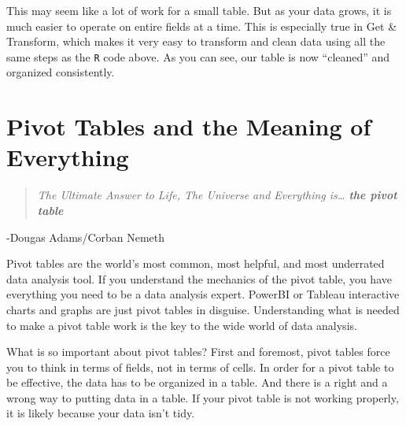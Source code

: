 \documentclass[]{book}
\newenvironment{Shaded}{\begin{snugshade}}{\end{snugshade}}
\newcommand{\CommentTok}[1]{\textcolor[rgb]{0.56,0.35,0.01}{\textit{#1}}}
\newcommand{\DataTypeTok}[1]{\textcolor[rgb]{0.13,0.29,0.53}{#1}}
\newcommand{\KeywordTok}[1]{\textcolor[rgb]{0.13,0.29,0.53}{\textbf{#1}}}
\newcommand{\NormalTok}[1]{#1}
\newcommand{\OperatorTok}[1]{\textcolor[rgb]{0.81,0.36,0.00}{\textbf{#1}}}
\newcommand{\OtherTok}[1]{\textcolor[rgb]{0.56,0.35,0.01}{#1}}
\newcommand{\StringTok}[1]{\textcolor[rgb]{0.31,0.60,0.02}{#1}}
\begin{document}
\begin{Shaded}
\begin{Highlighting}[]
{{{{{\CommentTok{#print to datatable}
\NormalTok{sites_cleaned}\OperatorTok{%
    \DataTypeTok{extensions =} \StringTok{'Buttons'}\NormalTok{, }
    \DataTypeTok{options =} \KeywordTok{list}\NormalTok{(}\DataTypeTok{dom =} \StringTok{'Bfrtip'}\NormalTok{, }
                   \DataTypeTok{buttons =} \StringTok{'excel'}\NormalTok{,}
                   \DataTypeTok{searching =} \OtherTok{FALSE}\NormalTok{))}
\end{Highlighting}
\end{Shaded}

\hypertarget{htmlwidget-6a7207c5323903c22246}{}

This may seem like a lot of work for a small table. But as your data grows, it is much easier to operate on entire fields at a time. This is especially true in Get \& Transform, which makes it very easy to transform and clean data using all the same steps as the \texttt{R} code above. As you can see, our table is now ``cleaned'' and organized consistently.

\hypertarget{pivot-tables-and-the-meaning-of-everything}{%
\section{Pivot Tables and the Meaning of Everything}\label{pivot-tables-and-the-meaning-of-everything}}

\begin{quote}
\emph{The Ultimate Answer to Life, The Universe and Everything is\ldots{} \textbf{the pivot table}}
\end{quote}

-Dougas Adams/Corban Nemeth

Pivot tables are the world's most common, most helpful, and most underrated data analysis tool. If you understand the mechanics of the pivot table, you have everything you need to be a data analysis expert. PowerBI or Tableau interactive charts and graphs are just pivot tables in disguise. Understanding what is needed to make a pivot table work is the key to the wide world of data analysis.

What is so important about pivot tables? First and foremost, pivot tables force you to think in terms of fields, not in terms of cells. In order for a pivot table to be effective, the data has to be organized in a table. And there is a right and a wrong way to putting data in a table. If your pivot table is not working properly, it is likely because your data isn't tidy.
\end{document}
